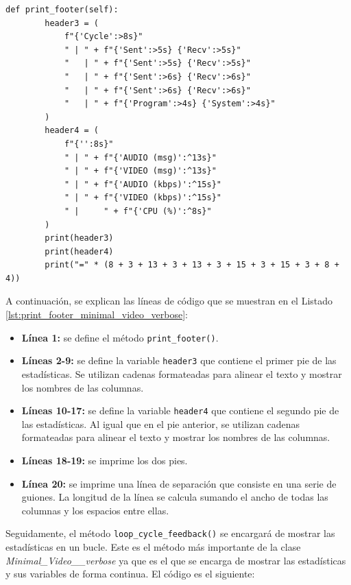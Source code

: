 \begin{lstlisting}[style=pythonstyle, caption={Método \texttt{print\_footer()} de \textit{Minimal\_Video\_verbose}.}, label={lst:print_footer_minimal_video_verbose}]
def print_footer(self):
        header3 = (
            f"{'Cycle':>8s}"
            " | " + f"{'Sent':>5s} {'Recv':>5s}"
            "   | " + f"{'Sent':>5s} {'Recv':>5s}"
            "   | " + f"{'Sent':>6s} {'Recv':>6s}"
            "   | " + f"{'Sent':>6s} {'Recv':>6s}"
            "   | " + f"{'Program':>4s} {'System':>4s}"
        )
        header4 = (
            f"{'':8s}"
            " | " + f"{'AUDIO (msg)':^13s}"
            " | " + f"{'VIDEO (msg)':^13s}"
            " | " + f"{'AUDIO (kbps)':^15s}"
            " | " + f"{'VIDEO (kbps)':^15s}"
            " |     " + f"{'CPU (%)':^8s}"
        )
        print(header3)
        print(header4)
        print("=" * (8 + 3 + 13 + 3 + 13 + 3 + 15 + 3 + 15 + 3 + 8 + 4))
\end{lstlisting}
\vspace{\baselineskip}

A continuación, se explican las líneas de código que se muestran en el Listado \ref{lst:print_footer_minimal_video_verbose}:
\begin{itemize}
    \item \textbf{Línea 1:} se define el método \texttt{print\_footer()}.
    \item \textbf{Líneas 2-9:} se define la variable \texttt{header3} que contiene el primer pie de las estadísticas. Se utilizan cadenas formateadas para alinear el texto y mostrar los nombres de las columnas.
    \item \textbf{Líneas 10-17:} se define la variable \texttt{header4} que contiene el segundo pie de las estadísticas. Al igual que en el pie anterior, se utilizan cadenas formateadas para alinear el texto y mostrar los nombres de las columnas.
    \item \textbf{Líneas 18-19:} se imprime los dos pies.
    \item \textbf{Línea 20:} se imprime una línea de separación que consiste en una serie de guiones. La longitud de la línea se calcula sumando el ancho de todas las columnas y los espacios entre ellas.
\end{itemize}
\vspace{\baselineskip}


Seguidamente, el método \texttt{loop\_cycle\_feedback()} se encargará de mostrar las estadísticas en un bucle. Este es el método más importante de la clase \textit{Minimal\_Video\_\_verbose} ya que es el que se encarga de mostrar las estadísticas y sus variables de forma continua. El código es el siguiente:

